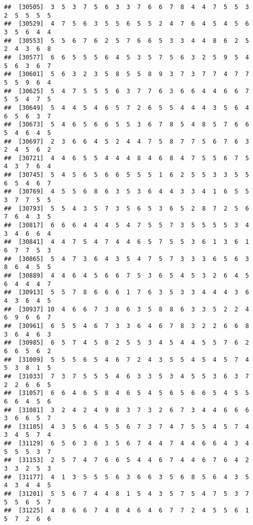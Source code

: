 \documentclass[
]{book}
\begin{document}
\begin{verbatim}
##  [30505]  3  5  3  7  5  6  3  3  7  6  6  7  8  4  4  7  5  5  3  2  5  5  5  5
##  [30529]  4  7  5  6  3  5  5  6  5  5  2  4  7  6  4  5  4  5  6  3  5  6  4  4
##  [30553]  5  5  6  7  6  2  5  7  6  6  5  3  3  4  4  8  6  2  5  2  4  3  6  8
##  [30577]  6  6  5  5  5  6  4  5  3  5  7  5  6  3  2  5  9  5  4  5  6  3  6  7
##  [30601]  5  6  3  2  3  5  8  5  5  8  9  3  7  3  7  7  4  7  7  5  5  9  6  4
##  [30625]  5  4  7  5  5  5  6  3  7  7  6  3  6  6  4  4  6  6  7  5  5  4  7  5
##  [30649]  5  4  4  5  4  6  5  7  2  6  5  5  4  4  4  3  5  6  4  6  5  6  3  7
##  [30673]  5  4  6  5  6  6  5  5  3  6  7  8  5  4  8  5  7  6  6  5  4  6  4  5
##  [30697]  2  3  6  6  4  5  2  4  4  7  5  8  7  7  5  6  7  6  3  2  4  5  6  2
##  [30721]  4  4  6  5  5  4  4  4  8  4  6  8  4  7  5  5  6  7  5  4  3  7  6  4
##  [30745]  5  4  5  6  5  6  6  5  5  5  1  6  2  5  5  3  3  5  5  6  5  4  6  7
##  [30769]  4  5  5  6  8  6  3  5  3  6  4  4  3  3  4  1  6  5  5  3  7  7  5  5
##  [30793]  5  5  4  3  5  7  3  5  6  5  3  6  5  2  8  7  2  5  6  7  6  4  3  5
##  [30817]  6  6  6  4  4  4  5  4  7  5  5  7  3  5  5  5  5  3  4  3  4  6  6  4
##  [30841]  4  4  7  5  4  7  4  4  6  5  7  5  5  3  6  1  3  6  1  6  7  7  5  3
##  [30865]  5  4  7  3  6  4  3  5  4  7  5  7  3  3  3  6  5  6  3  8  6  4  5  5
##  [30889]  4  4  6  4  5  6  6  7  5  3  6  5  4  5  3  2  6  4  5  6  4  4  4  7
##  [30913]  5  5  7  8  6  6  6  1  7  6  3  5  3  3  4  4  4  3  6  4  3  6  4  5
##  [30937] 10  4  6  6  7  3  8  6  3  5  8  8  6  3  3  5  2  2  4  6  9  6  6  7
##  [30961]  6  5  5  4  6  7  3  3  6  4  6  7  8  3  2  2  6  6  8  3  6  4  6  3
##  [30985]  6  5  7  4  5  8  2  5  5  3  4  5  4  4  5  5  7  6  2  6  6  5  6  2
##  [31009]  5  5  5  6  5  4  6  7  2  4  3  5  5  4  5  4  5  7  4  5  3  8  1  5
##  [31033]  7  3  7  5  5  5  4  6  3  3  5  3  4  5  5  3  6  3  7  2  2  6  6  5
##  [31057]  6  6  4  6  5  8  4  6  5  4  5  6  5  6  6  5  4  5  5  6  6  4  5  6
##  [31081]  3  2  4  2  4  9  8  3  7  3  2  6  7  3  4  4  6  6  6  3  6  6  5  7
##  [31105]  4  3  5  6  4  5  5  6  7  3  7  4  7  5  5  4  5  7  4  3  4  5  7  4
##  [31129]  6  5  6  3  6  3  5  6  7  4  4  7  4  4  6  6  4  3  4  5  5  5  3  7
##  [31153]  2  5  7  4  7  6  6  5  4  4  6  7  4  4  6  7  6  4  2  3  3  2  5  3
##  [31177]  4  1  3  5  5  5  6  3  6  6  3  5  6  8  5  6  4  3  5  4  3  4  4  5
##  [31201]  5  5  6  7  4  4  8  1  5  4  3  5  7  5  4  7  5  3  7  5  5  6  5  7
##  [31225]  4  8  6  6  7  4  8  4  6  4  6  7  7  2  4  5  5  6  1  5  7  2  6  6

\end{verbatim}
\end{document}
